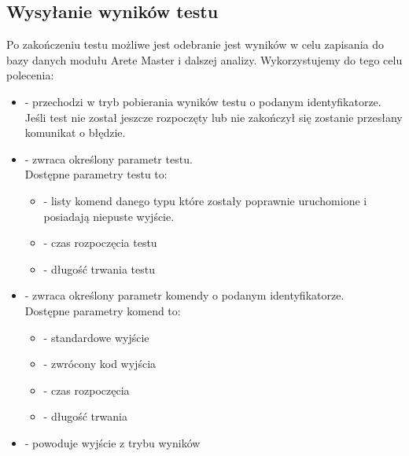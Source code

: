 \documentclass[00-praca-magisterska.tex]{subfiles}
\begin{document}
\subsection{Wysyłanie wyników testu}
\label{arete-slave-wysylanie-wynikow}

Po zakończeniu testu możliwe jest odebranie jest wyników w celu zapisania do
bazy danych modułu Arete Master i dalszej analizy. Wykorzystujemy do tego celu
polecenia:

\begin{itemize}
  \setlength{\itemsep}{10pt}

\item{ - przechodzi w tryb pobierania
wyników testu o podanym identyfikatorze. Jeśli test nie został jeszcze
rozpoczęty lub nie zakończył się zostanie przesłany komunikat o błędzie.}

\item{ - zwraca określony parametr testu. \\

Dostępne parametry testu to: \\

\begin{itemize}
  \setlength{\itemsep}{10pt}

\item{ - listy komend danego typu które
zostały poprawnie uruchomione i posiadają niepuste wyjście.}

\item{ - czas rozpoczęcia testu}

\item{ - długość trwania testu}

\end{itemize}}

\item{ - zwraca określony parametr
komendy o podanym identyfikatorze. \\

Dostępne parametry komend to: \\

\begin{itemize}
  \setlength{\itemsep}{10pt}

\item{ - standardowe wyjście}

\item{ - zwrócony kod wyjścia}

\item{ - czas rozpoczęcia}

\item{ - długość trwania}

\end{itemize}}

\item{ - powoduje wyjście z trybu wyników}

\end{itemize}
\end{document}
